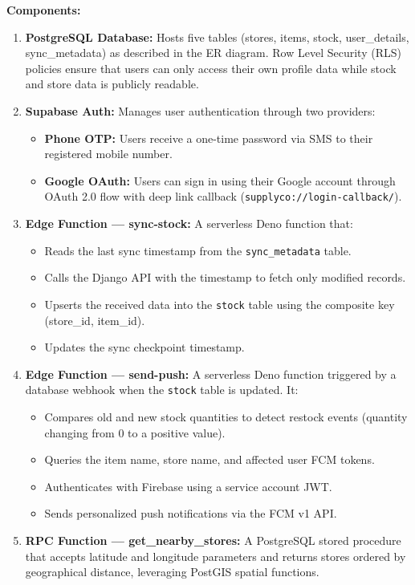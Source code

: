 \textbf{Components:}

\begin{enumerate}
    \item \textbf{PostgreSQL Database:} Hosts five tables (stores, items, stock, user\_details, sync\_metadata) as described in the ER diagram. Row Level Security (RLS) policies ensure that users can only access their own profile data while stock and store data is publicly readable.

    \item \textbf{Supabase Auth:} Manages user authentication through two providers:
    \begin{itemize}
        \item \textbf{Phone OTP:} Users receive a one-time password via SMS to their registered mobile number.
        \item \textbf{Google OAuth:} Users can sign in using their Google account through OAuth 2.0 flow with deep link callback (\texttt{supplyco://login-callback/}).
    \end{itemize}

    \item \textbf{Edge Function --- sync-stock:} A serverless Deno function that:
    \begin{itemize}
        \item Reads the last sync timestamp from the \texttt{sync\_metadata} table.
        \item Calls the Django API with the timestamp to fetch only modified records.
        \item Upserts the received data into the \texttt{stock} table using the composite key (store\_id, item\_id).
        \item Updates the sync checkpoint timestamp.
    \end{itemize}

    \item \textbf{Edge Function --- send-push:} A serverless Deno function triggered by a database webhook when the \texttt{stock} table is updated. It:
    \begin{itemize}
        \item Compares old and new stock quantities to detect restock events (quantity changing from 0 to a positive value).
        \item Queries the item name, store name, and affected user FCM tokens.
        \item Authenticates with Firebase using a service account JWT.
        \item Sends personalized push notifications via the FCM v1 API.
    \end{itemize}

    \item \textbf{RPC Function --- get\_nearby\_stores:} A PostgreSQL stored procedure that accepts latitude and longitude parameters and returns stores ordered by geographical distance, leveraging PostGIS spatial functions.
\end{enumerate}

